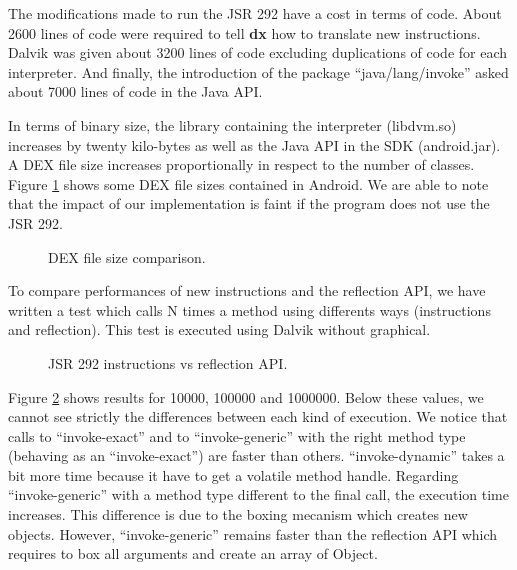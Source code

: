 \documentclass{sig-alternate}
\def \DALVIK{Dalvik\xspace}
\def \Jsr{JSR\xspace}
\def \JSR{\Jsr 292\xspace}
\newcommand{\fixme}[1]{{\color{red}FIXME #1}}
\begin{document}
  The modifications made to run the \JSR have a cost in terms of code.
  About 2600 lines of code were required to tell {\bf dx} how to translate new instructions.
  Dalvik was given about 3200 lines of code excluding duplications of code for each interpreter.
  And finally, the introduction of the package ``java/lang/invoke'' asked about 7000 lines of code in the Java API.


  In terms of binary size, the library containing the interpreter (libdvm.so) increases by twenty kilo-bytes as well as the Java API in the SDK (android.jar).
  A DEX file size increases proportionally in respect to the number of classes.
  Figure \ref{Rsize} shows some DEX file sizes contained in Android.
  We are able to note that the impact of our implementation is faint if the program does not use the \JSR.

  \begin{figure}[h]
    \dataset
    \resizebox{\linewidth}{!}{}
    \caption{DEX file size comparison.}
    \label{Rsize}
  \end{figure}

  To compare performances of new instructions and the reflection API,
  we have written a test which calls N times a method using differents ways (instructions and reflection).
  This test is executed using \DALVIK without graphical.

  \begin{figure}[!h]
    \resizebox{\linewidth}{!}{}
    \caption{JSR 292 instructions vs reflection API.}
    \label{Rinvoke}
  \end{figure}

  Figure \ref{Rinvoke} shows results for 10000, 100000 and 1000000.
  Below these values, we cannot see strictly the differences between each kind of execution.
  We notice that calls to ``invoke-exact'' and to ``invoke-generic'' with the right method type (behaving as an ``invoke-exact'') are faster than others.
  ``invoke-dynamic'' takes a bit more time because it have to get a volatile method handle.
  Regarding ``invoke-generic'' with a method type different to the final call, the execution time increases.
  This difference is due to the boxing mecanism which creates new objects.
  However, ``invoke-generic'' remains faster than the reflection API which requires to box all arguments and create an array of Object.\\
  
\end{document}
